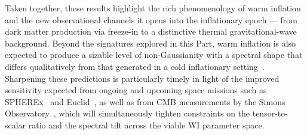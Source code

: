 Taken together, these results highlight the rich phenomenology of warm inflation and the new observational channels it opens into the inflationary epoch --- from dark matter production via freeze-in to a distinctive thermal gravitational-wave background. Beyond the signatures explored in this Part, warm inflation is also expected to produce a sizable level of non-Gaussianity with a spectral shape that differs qualitatively from that generated in a cold inflationary setting~\cite{Bastero-Gil:2014raa, Mirbabayi:2022cbt}. Sharpening these predictions is particularly timely in light of the improved sensitivity expected from ongoing and upcoming space missions such as SPHEREx~\cite{SPHEREx:2014bgr} and Euclid~\cite{Euclid:2024ris}, as well as from CMB measurements by the Simons Observatory~\cite{SimonsObservatory:2018koc,SimonsObservatory:2020noise}, which will simultaneously tighten constraints on the tensor-to-scalar ratio and the spectral tilt across the viable WI parameter space.